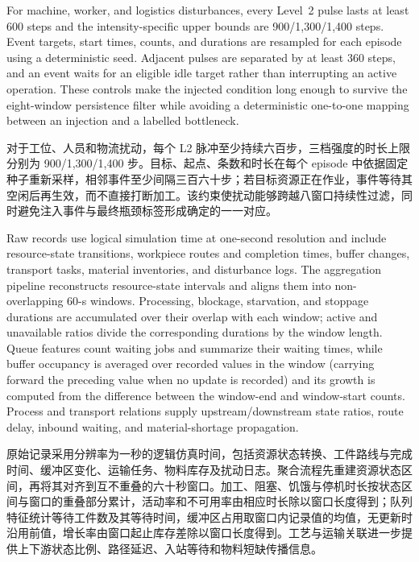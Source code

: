 \documentclass[a4paper,fleqn]{cas-dc}
\newcommand{\zhpara}[1]{%
  \par\begingroup\small\color{black!72}\noindent #1\par\endgroup}
\begin{document}
For machine, worker, and logistics disturbances, every Level~2 pulse lasts at least 600 steps and the intensity-specific upper bounds are 900/1,300/1,400 steps. Event targets, start times, counts, and durations are resampled for each episode using a deterministic seed. Adjacent pulses are separated by at least 360 steps, and an event waits for an eligible idle target rather than interrupting an active operation. These controls make the injected condition long enough to survive the eight-window persistence filter while avoiding a deterministic one-to-one mapping between an injection and a labelled bottleneck.

\zhpara{对于工位、人员和物流扰动，每个 L2 脉冲至少持续六百步，三档强度的时长上限分别为 900/1,300/1,400 步。目标、起点、条数和时长在每个 episode 中依据固定种子重新采样，相邻事件至少间隔三百六十步；若目标资源正在作业，事件等待其空闲后再生效，而不直接打断加工。该约束使扰动能够跨越八窗口持续性过滤，同时避免注入事件与最终瓶颈标签形成确定的一一对应。}

Raw records use logical simulation time at one-second resolution and include resource-state transitions, workpiece routes and completion times, buffer changes, transport tasks, material inventories, and disturbance logs. The aggregation pipeline reconstructs resource-state intervals and aligns them into non-overlapping 60-s windows. Processing, blockage, starvation, and stoppage durations are accumulated over their overlap with each window; active and unavailable ratios divide the corresponding durations by the window length. Queue features count waiting jobs and summarize their waiting times, while buffer occupancy is averaged over recorded values in the window (carrying forward the preceding value when no update is recorded) and its growth is computed from the difference between the window-end and window-start counts. Process and transport relations supply upstream/downstream state ratios, route delay, inbound waiting, and material-shortage propagation.

\zhpara{原始记录采用分辨率为一秒的逻辑仿真时间，包括资源状态转换、工件路线与完成时间、缓冲区变化、运输任务、物料库存及扰动日志。聚合流程先重建资源状态区间，再将其对齐到互不重叠的六十秒窗口。加工、阻塞、饥饿与停机时长按状态区间与窗口的重叠部分累计，活动率和不可用率由相应时长除以窗口长度得到；队列特征统计等待工件数及其等待时间，缓冲区占用取窗口内记录值的均值，无更新时沿用前值，增长率由窗口起止库存差除以窗口长度得到。工艺与运输关联进一步提供上下游状态比例、路径延迟、入站等待和物料短缺传播信息。}
\end{document}
